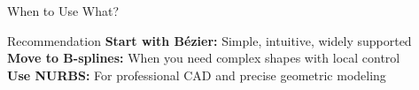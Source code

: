 \begin{frame}{When to Use What?}
  \begin{conceptbox}{Recommendation}
    \footnotesize
    \textbf{Start with Bézier:} Simple, intuitive, widely supported \\
    \textbf{Move to B-splines:} When you need complex shapes with local control \\
    \textbf{Use NURBS:} For professional CAD and precise geometric modeling
  \end{conceptbox}
\end{frame}
